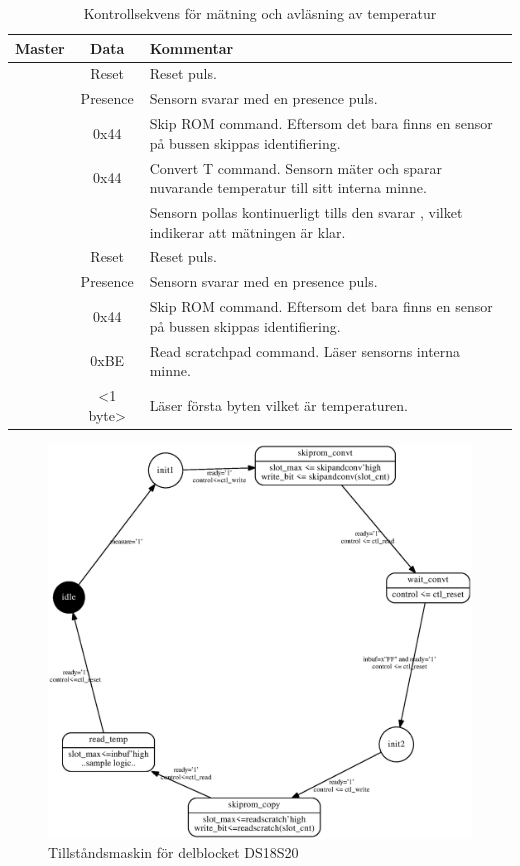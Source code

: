 \documentclass[a4paper]{scrreprt}
\begin{document}
\begin{table}[H]

\begin{tabularx}{\textwidth}[h]{c c X}
	\hline
	Master & Data & Kommentar\\
	\hline
	
	\Tx & Reset & Reset puls.\\
	\Rx & Presence & Sensorn svarar med en presence puls.\\
	\Tx & 0x44 & Skip ROM command. Eftersom det bara finns en sensor på bussen skippas identifiering.\\
	\Tx & 0x44 & Convert T command. Sensorn mäter och sparar nuvarande temperatur till sitt interna minne.\\
	\Rx & & Sensorn pollas kontinuerligt tills den svarar \high{}, vilket indikerar att mätningen är klar.\\
	\Tx & Reset & Reset puls.\\
	\Rx & Presence & Sensorn svarar med en presence puls.\\
	\Tx & 0x44 & Skip ROM command. Eftersom det bara finns en sensor på bussen skippas identifiering.\\
	\Tx & 0xBE & Read scratchpad command. Läser sensorns interna minne.  \\
	\Rx & <1 byte> & Läser första byten vilket är temperaturen.\\
	
	\hline
\end{tabularx}
\caption{Kontrollsekvens för mätning och avläsning av temperatur}
\end{table}


\begin{figure}[h!]
	\centering
	\includegraphics[width=\textwidth]{ds18s20_fsm.eps}
	\caption{Tillståndsmaskin för delblocket DS18S20}
	\label{fig:ds18s20_fsm}
\end{figure}
\end{document}
